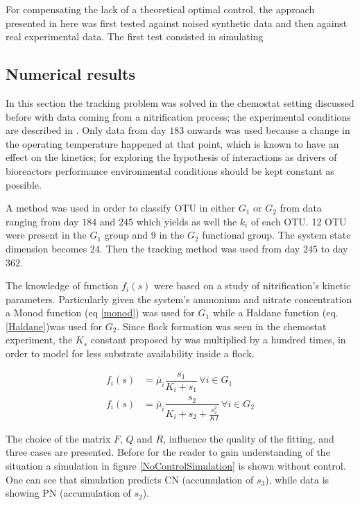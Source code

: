 \documentclass[3p,times]{elsarticle}
\begin{document}
For compensating the lack of a theoretical optimal control, the approach presented in here was first tested against noised synthetic data and then against real experimental data. The first test consisted in simulating
\subsection{Numerical results}


In this section the tracking problem was solved in the chemostat setting discussed before with data coming from a nitrification process; the experimental conditions are described in \cite{dumont2008observers}. Only data from day $183$ onwards was used because a change in the operating temperature happened at that point, which is known to have an effect on the kinetics; for exploring the hypothesis of interactions as drivers of bioreactors performance environmental conditions should be kept constant as possible.

A method was used in order to classify OTU in either $G_1$ or $G_2$ from data ranging from day $184$ and $245$ which yields as well the $k_i$ of each OTU.  12 OTU were present in the $G_1$ group and 9 in the $G_2$ functional group. The system state dimension becomes 24. Then the tracking method was used from day $245$ to day $362$.

The knowledge of function $f_i(s)$ were based on a study of nitrification's kinetic parameters\cite{Wiesmann1994}. Particularly given the system's ammonium and nitrate concentration a Monod function (eq \eqref{monod}) was used for $G_1$ while a Haldane function (eq. \eqref{Haldane})was used for $G_2$. Since flock formation was seen in the chemostat experiment, the $K_s$ constant proposed by \cite{Wiesmann1994} was multiplied by a hundred times, in order to model for less substrate availability inside a flock. 

\begin{align}
\label{monod} f_i(s) &= \bar{\mu}_i \dfrac{s_1}{K_i +s_1} \, \forall i \in G_1 \\
\label{Haldane} f_i(s) &= \bar{\mu}_i \dfrac{s_2}{K_i +s_2 + \frac{s_2^2}{KI}} \, \forall i \in G_2
\end{align}

The choice of the matrix $F$, $Q$ and $R$, influence the quality of the fitting, and three cases are presented. Before for the reader to gain understanding of the situation a simulation in figure \ref{NoControlSimulation} is shown without control. One can see that simulation predicts CN (accumulation of $s_3$), while data is showing PN  (accumulation of $s_2$).
\end{document}
